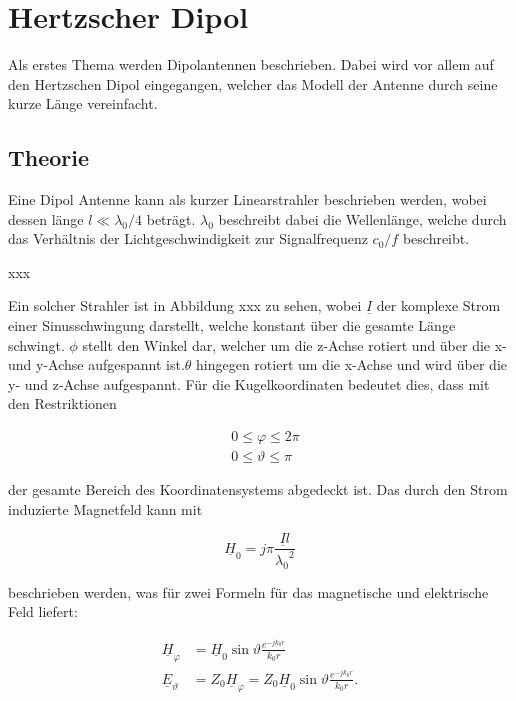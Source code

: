 \section{Hertzscher Dipol}

Als erstes Thema werden Dipolantennen beschrieben. Dabei wird vor allem auf den Hertzschen Dipol eingegangen, welcher das Modell der Antenne durch seine kurze Länge vereinfacht.

\subsection{Theorie}\label{sec:HerDip}

Eine Dipol Antenne kann als kurzer Linearstrahler beschrieben werden, wobei dessen länge $l \ll \lambda_0 /4$ beträgt. $\lambda_0$ beschreibt dabei die Wellenlänge, welche durch das Verhältnis der Lichtgeschwindigkeit zur Signalfrequenz $c_0/f$ beschreibt. 

xxx

Ein solcher Strahler ist in Abbildung xxx zu sehen, wobei $\underline{I}$ der komplexe Strom einer Sinusschwingung darstellt, welche konstant über die gesamte Länge schwingt. $\phi$ stellt den Winkel dar, welcher um die z-Achse rotiert und über die x- und y-Achse aufgespannt ist.$\theta$ hingegen rotiert um die x-Achse und wird über die y- und z-Achse aufgespannt. Für die Kugelkoordinaten bedeutet dies, dass mit den Restriktionen 

\begin{align}
&0 \leq \varphi \leq 2\pi\\
&0 \leq \vartheta \leq \pi \label{eq:HertzTheta}
\end{align}

der gesamte Bereich des Koordinatensystems abgedeckt ist. Das durch den Strom induzierte Magnetfeld kann mit 

\begin{equation}
\underline{H}_0 = j\pi \frac{\underline{I}l}{{\lambda_0}^2}
\end{equation}

beschrieben werden, was für zwei Formeln für das magnetische und elektrische Feld liefert:

\begin{align}
\underline{H}_\varphi   &= \underline{H}_0 \sin \vartheta \frac{e^{-jk_0r}}{k_0r}\\
\underline{E}_\vartheta &= Z_0 \underline{H}_\varphi = Z_0 \underline{H}_0 \sin \vartheta \frac{e^{-jk_0r}}{k_0r}.\label{eq:HertzE}
\end{align}

